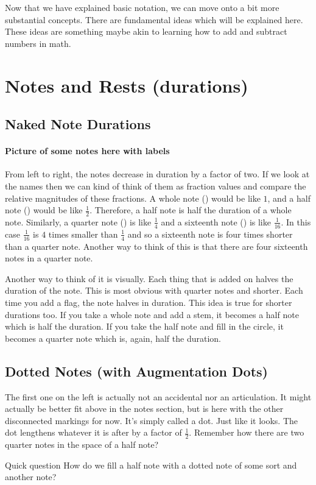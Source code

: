 \documentclass[../OpenAppliedMusicTheory.tex]{subfiles}
\begin{document}
    


    Now that we have explained basic notation, we can move onto a bit more substantial concepts. There are fundamental ideas which will be explained here. These ideas are something maybe akin to learning how to add and subtract numbers in math.

    \section{Notes and Rests (durations)}\label{ch2:duration}
        \subsection{Naked Note Durations}
        \paragraph{Picture of some notes here with labels}
        From left to right, the notes decrease in duration by a factor of two. If we look at the names then we can kind of think of them as fraction values and compare the relative magnitudes of these fractions. A whole note (\musWhole) would be like $1$, and a half note (\musHalf) would be like $\frac{1}{2}$. Therefore, a half note is half the duration of a whole note. Similarly, a quarter note (\musQuarter) is like $\frac{1}{4}$ and a sixteenth note (\musSixteenth) is like $\frac{1}{16}$. In this case $\frac{1}{16}$ is $4$ times smaller than $\frac{1}{4}$ and so a sixteenth note is four times shorter than a quarter note. Another way to think of this is that there are four sixteenth notes in a quarter note.

        Another way to think of it is visually. Each thing that is added on halves the duration of the note. This is most obvious with quarter notes and shorter. Each time you add a flag, the note halves in duration. This idea is true for shorter durations too. If you take a whole note and add a stem, it becomes a half note which is half the duration. If you take the half note and fill in the circle, it becomes a quarter note which is, again, half the duration.

        \subsection{Dotted Notes (with Augmentation Dots)}
        The first one on the left is actually not an accidental nor an articulation. It might actually be better fit above in the notes section, but is here with the other disconnected markings for now. It's simply called a dot. Just like it looks. The dot lengthens whatever it is after by a factor of $\frac{1}{2}$. Remember how there are two quarter notes in the space of a half note? %
        \begin{note}{Quick question}
            How do we fill a half note with a dotted note of some sort and another note?
        \end{note}
\end{document}
